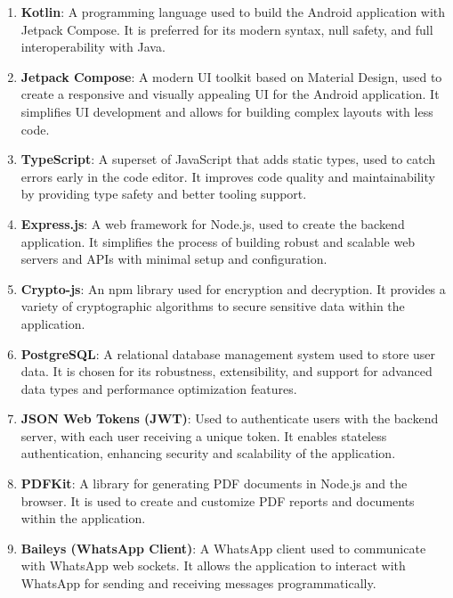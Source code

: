 \begin{enumerate}[label=\roman*.]
  \item \textbf{Kotlin}: A programming language used to build the Android application with Jetpack Compose.
  It is preferred for its modern syntax, null safety, and full interoperability with Java.\cite{kt}
  \item \textbf{Jetpack Compose}: A modern UI toolkit based on Material Design, used to create a responsive and visually appealing UI for the Android application.
  It simplifies UI development and allows for building complex layouts with less code.\cite{kt}
  \item \textbf{TypeScript}: A superset of JavaScript that adds static types, used to catch errors early in the code editor.
  It improves code quality and maintainability by providing type safety and better tooling support.\cite{TypeScript}
  \item \textbf{Express.js}: A web framework for Node.js, used to create the backend application.
  It simplifies the process of building robust and scalable web servers and APIs with minimal setup and configuration.\cite{Express}
  \item \textbf{Crypto-js}: An npm library used for encryption and decryption.
  It provides a variety of cryptographic algorithms to secure sensitive data within the application.\cite{Crypto-js}
  \item \textbf{PostgreSQL}: A relational database management system used to store user data.
  It is chosen for its robustness, extensibility, and support for advanced data types and performance optimization features.\cite{psql}
  \item \textbf{JSON Web Tokens (JWT)}: Used to authenticate users with the backend server, with each user receiving a unique token.
  It enables stateless authentication, enhancing security and scalability of the application.\cite{JWT}
  \item \textbf{PDFKit}: A library for generating PDF documents in Node.js and the browser.
  It is used to create and customize PDF reports and documents within the application.\cite{PDFKit}
  \item \textbf{Baileys (WhatsApp Client)}: A WhatsApp client used to communicate with WhatsApp web sockets.
  It allows the application to interact with WhatsApp for sending and receiving messages programmatically.\cite{Baileys}
\end{enumerate}